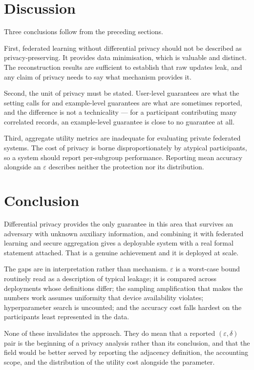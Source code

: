 \documentclass[11pt,a4paper]{article}
\begin{document}
\section{Discussion}
\label{sec:discussion}

Three conclusions follow from the preceding sections.

First, federated learning without differential privacy should not be described
as privacy-preserving. It provides data minimisation, which is valuable and
distinct. The reconstruction results \cite{zhu2019} are sufficient to
establish that raw updates leak, and any claim of privacy needs to say what
mechanism provides it.

Second, the unit of privacy must be stated. User-level guarantees are what the
setting calls for and example-level guarantees are what are sometimes
reported, and the difference is not a technicality --- for a participant
contributing many correlated records, an example-level guarantee is close to
no guarantee at all.

Third, aggregate utility metrics are inadequate for evaluating private
federated systems. The cost of privacy is borne disproportionately by
atypical participants, so a system should report per-subgroup performance.
Reporting mean accuracy alongside an $\varepsilon$ describes neither the
protection nor its distribution.

\section{Conclusion}
\label{sec:conclusion}

Differential privacy provides the only guarantee in this area that survives an
adversary with unknown auxiliary information, and combining it with federated
learning and secure aggregation gives a deployable system with a real formal
statement attached. That is a genuine achievement and it is deployed at scale.

The gaps are in interpretation rather than mechanism. $\varepsilon$ is a
worst-case bound routinely read as a description of typical leakage; it is
compared across deployments whose definitions differ; the sampling
amplification that makes the numbers work assumes uniformity that device
availability violates; hyperparameter search is uncounted; and the accuracy
cost falls hardest on the participants least represented in the data.

None of these invalidates the approach. They do mean that a reported
$(\varepsilon, \delta)$ pair is the beginning of a privacy analysis rather
than its conclusion, and that the field would be better served by reporting
the adjacency definition, the accounting scope, and the distribution of the
utility cost alongside the parameter.
\end{document}

